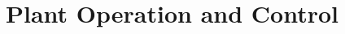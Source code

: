 \chapter{Plant Operation and Control}
\label{sec:operation-control}

\begin{refsection}

\localtableofcontents
\newpage








\clearpage
\printbibliography[heading=subbibintoc]

\begin{subappendices}
    
    
\end{subappendices}

\end{refsection}